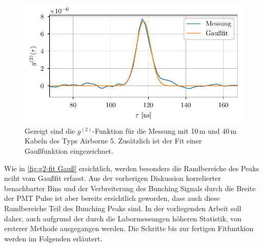\begin{figure}[h]
    \centering
    \includegraphics{images/Analysis/g2_gaussfit.pdf}
    \caption{Gezeigt sind die $g^{(2)}$-Funktion für die Messung mit 10\,m und 40\,m Kabeln des Typs Airborne 5. Zusätzlich ist der Fit einer Gaußfunktion eingezeichnet.}
    \label{fig:g2-fit Gauß}
\end{figure}
Wie in \autoref{fig:g2-fit Gauß} ersichtlich, werden besonders die Randbereiche des Peaks nciht vom Gaußfit erfasst. 
Aus der vorherigen Diskussion korrelierter benachbarter Bins und der Verbreiterung des Bunching Signals durch die Breite der PMT Pulse ist aber bereits ersichtlich geworden, dass auch diese Randbereiche Teil des Bunching Peaks sind. 
In der vorliegenden Arbeit soll daher, auch aufgrund der durch die Labormessungen höheren Statistik, von ersterer Methode ausgegangen werden. 
Die Schritte bis zur fertigen Fitfuntkion werden im Folgenden erläutert.

